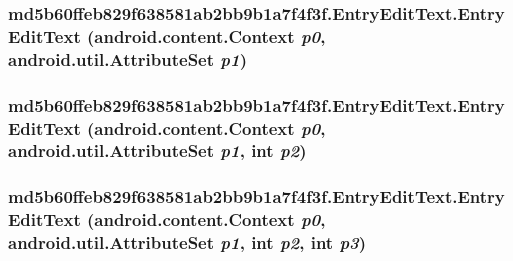 \hypertarget{classmd5b60ffeb829f638581ab2bb9b1a7f4f3f_1_1_entry_edit_text_2ed76d0883a4b11b021ecdb18a945f8f}{
\subsubsection[{EntryEditText}]{\setlength{\rightskip}{0pt plus 5cm}md5b60ffeb829f638581ab2bb9b1a7f4f3f.EntryEditText.EntryEditText (android.content.Context {\em p0}, \/  android.util.AttributeSet {\em p1})}}
\label{classmd5b60ffeb829f638581ab2bb9b1a7f4f3f_1_1_entry_edit_text_2ed76d0883a4b11b021ecdb18a945f8f}


\hypertarget{classmd5b60ffeb829f638581ab2bb9b1a7f4f3f_1_1_entry_edit_text_0a1ed18804c51763e823cb1b17d9a256}{
\subsubsection[{EntryEditText}]{\setlength{\rightskip}{0pt plus 5cm}md5b60ffeb829f638581ab2bb9b1a7f4f3f.EntryEditText.EntryEditText (android.content.Context {\em p0}, \/  android.util.AttributeSet {\em p1}, \/  int {\em p2})}}
\label{classmd5b60ffeb829f638581ab2bb9b1a7f4f3f_1_1_entry_edit_text_0a1ed18804c51763e823cb1b17d9a256}


\hypertarget{classmd5b60ffeb829f638581ab2bb9b1a7f4f3f_1_1_entry_edit_text_51d0a64d0a474ed8aabfefc92289d233}{
\subsubsection[{EntryEditText}]{\setlength{\rightskip}{0pt plus 5cm}md5b60ffeb829f638581ab2bb9b1a7f4f3f.EntryEditText.EntryEditText (android.content.Context {\em p0}, \/  android.util.AttributeSet {\em p1}, \/  int {\em p2}, \/  int {\em p3})}}
\label{classmd5b60ffeb829f638581ab2bb9b1a7f4f3f_1_1_entry_edit_text_51d0a64d0a474ed8aabfefc92289d233}




